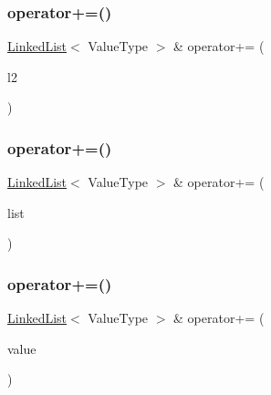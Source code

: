 \subsubsection{\texorpdfstring{operator+=()}{operator+=()}\hspace{0.1cm}{\footnotesize\ttfamily [1/3]}}
{\footnotesize\ttfamily \mbox{\hyperlink{classLinkedList}{Linked\+List}}$<$ Value\+Type $>$ \& operator+= (\begin{DoxyParamCaption}\item[{const \mbox{\hyperlink{classLinkedList}{Linked\+List}}$<$ Value\+Type $>$ \&}]{l2 }\end{DoxyParamCaption})}

\mbox{\label{classLinkedList_a7c08c1a4983616294a10bbbf43d3f8df}} 
\subsubsection{\texorpdfstring{operator+=()}{operator+=()}\hspace{0.1cm}{\footnotesize\ttfamily [2/3]}}
{\footnotesize\ttfamily \mbox{\hyperlink{classLinkedList}{Linked\+List}}$<$ Value\+Type $>$ \& operator+= (\begin{DoxyParamCaption}\item[{std\+::initializer\+\_\+list$<$ Value\+Type $>$}]{list }\end{DoxyParamCaption})}

\mbox{\label{classLinkedList_a032d4f974bb2083db2bab6a4e8e6f248}} 
\subsubsection{\texorpdfstring{operator+=()}{operator+=()}\hspace{0.1cm}{\footnotesize\ttfamily [3/3]}}
{\footnotesize\ttfamily \mbox{\hyperlink{classLinkedList}{Linked\+List}}$<$ Value\+Type $>$ \& operator+= (\begin{DoxyParamCaption}\item[{const Value\+Type \&}]{value }\end{DoxyParamCaption})}

\mbox{\label{classLinkedList_a01622233116ad1ae4333e3e1ed1f7ca5}} 
